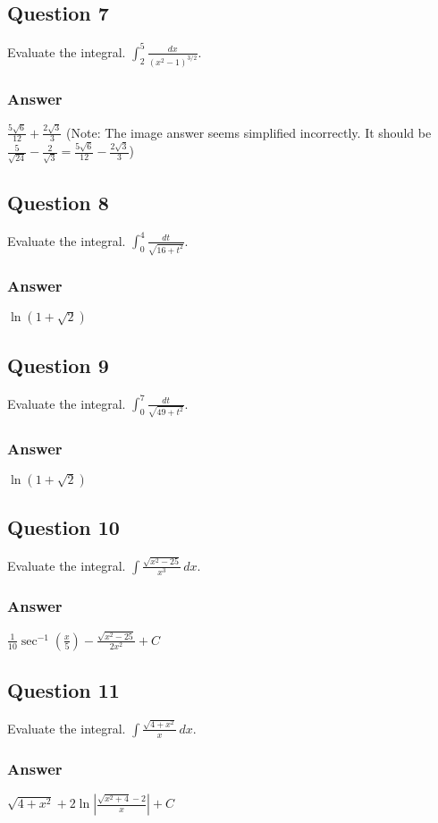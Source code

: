 \documentclass{article}
\begin{document}
\subsection*{Question 7}
Evaluate the integral. $\int_2^5 \frac{dx}{(x^2-1)^{3/2}}$.
\subsubsection*{Answer}
$ \frac{5\sqrt{6}}{12} + \frac{2\sqrt{3}}{3} $ (Note: The image answer seems simplified incorrectly. It should be $\frac{5}{\sqrt{24}} - \frac{2}{\sqrt{3}} = \frac{5\sqrt{6}}{12} - \frac{2\sqrt{3}}{3}$)

\subsection*{Question 8}
Evaluate the integral. $\int_0^4 \frac{dt}{\sqrt{16+t^2}}$.
\subsubsection*{Answer}
$ \ln(1+\sqrt{2}) $

\subsection*{Question 9}
Evaluate the integral. $\int_0^7 \frac{dt}{\sqrt{49+t^2}}$.
\subsubsection*{Answer}
$ \ln(1+\sqrt{2}) $

\subsection*{Question 10}
Evaluate the integral. $\int \frac{\sqrt{x^2-25}}{x^3} \,dx$.
\subsubsection*{Answer}
$ \frac{1}{10}\sec^{-1}(\frac{x}{5}) - \frac{\sqrt{x^2-25}}{2x^2} + C $

\subsection*{Question 11}
Evaluate the integral. $\int \frac{\sqrt{4+x^2}}{x} \,dx$.
\subsubsection*{Answer}
$ \sqrt{4+x^2} + 2\ln|\frac{\sqrt{x^2+4}-2}{x}| + C $
\end{document}
